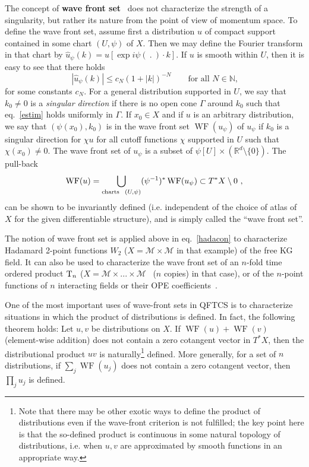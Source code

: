 \documentclass[12pt]{article}
\newcommand{\RR}{\mathbb{R}}
\newcommand{\M}{\mathscr{M}}
\newcommand{\T}{{\rm T}}
\DeclareMathOperator{\WF}{WF}
\theoremstyle{plain}
\theoremstyle{definition}
\def\ben{\begin{equation}}
\def\een{\end{equation}}
\begin{document}
The concept of {\bf wave front set}~\cite{hor} does not characterize the strength of a singularity, but
rather its nature from the point of view of momentum space.
To define the wave front set, assume first a distribution $u$ of compact support contained
in some chart $(U,\psi)$ of $X$. Then we may define the Fourier transform in that
chart by $\hat u_\psi(k) = u[\exp i\psi( \ . \ ) \cdot k]$. If $u$ is smooth within
$U$, then it is easy to see that there holds
\ben\label{estim}
|\hat u_\psi(k)| \le c_N (1+|k|)^{-N} \qquad \text{for all $N \in \mathbb N$,}
\een
for some constants $c_N$. For a general distribution supported in
$U$, we say that $k_0 \neq 0$ is a {\em singular direction} if there is no open cone $\Gamma$ around $k_0$ such that 
eq.~\eqref{estim} holds uniformly in $\Gamma$. If $x_0 \in X$ and if $u$ is an arbitrary
distribution, we say that $(\psi(x_0), k_0)$ is in the wave front set $\WF(u_\psi)$ of
$u_\psi$ if $k_0$ is a singular direction for $\chi u$ for all cutoff functions
$\chi$ supported in $U$ such that $\chi(x_0) \neq 0$. The wave front set of $u_\psi$
is a subset of $\psi[U] \times (\RR^d \setminus\{0\})$. The pull-back
\ben
\WF(u) = \bigcup_{{\rm charts} \ \ (U,\psi)} (\psi^{-1})^* \WF(u_\psi) \subset T^* X \setminus 0 \ ,
\een
can be shown to be invariantly defined (i.e. independent of the choice of atlas of $X$
for the given differentiable structure), and is simply called the ``wave front set''.

The notion of wave front set is applied above in eq.~\eqref{hadacon} to characterize
Hadamard 2-point functions $W_{2}$ ($X = \M \times \M$ in that example) of the free KG field. It can also be used to characterize the wave front set of an $n$-fold time ordered product $\T_n$ ($X= \M \times ... \times \M$~\cite{bf1,bf2} ($n$ copies) in that case), or of the $n$-point functions of $n$ interacting fields or their OPE coefficients~\cite{h5}.

One of the most important
uses of wave-front sets in QFTCS is to characterize situations in which
the product of distributions is defined. In fact, the following theorem holds:
Let $u,v$ be distributions on $X$. If $\WF(u) + \WF(v)$ (element-wise addition) does
not contain a zero cotangent vector in $T^*X$, then the distributional product $uv$ is
naturally\footnote{Note that there may be other exotic ways to
define the product of distributions even if the wave-front criterion is not fulfilled; the key point here is that the so-defined product is continuous
in some natural topology of distributions, i.e. when $u,v$ are approximated by smooth functions in an appropriate way.} 
defined. More generally, for a set of $n$ distributions, if $\sum_j \WF(u_j)$
does not contain a zero cotangent vector, then $\prod_j u_j$ is defined.
\end{document}
